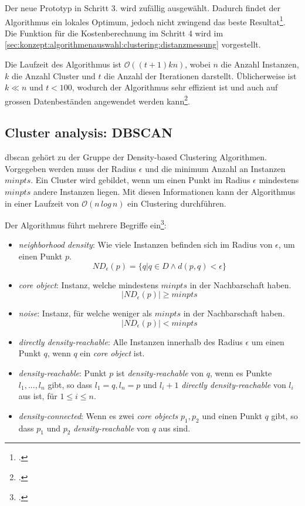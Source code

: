 Der neue Prototyp in Schritt 3. wird zufällig ausgewählt. Dadurch findet der Algorithmus ein lokales Optimum, jedoch nicht zwingend das beste Resultat\footcite{data_mining_concepts_and_techniques}.
Die Funktion für die Kostenberechnung im Schritt 4 wird im \cref{sec:konzept:algorithmenauswahl:clustering:distanzmessung} vorgestellt.

Die Laufzeit des Algorithmus ist $\mathcal{O}((t+1)kn)$, wobei $n$ die Anzahl Instanzen, $k$ die Anzahl Cluster und $t$ die Anzahl der Iterationen darstellt. Üblicherweise ist $k \ll n$ und $t < 100$, wodurch der Algorithmus sehr effizient ist und auch auf grossen Datenbeständen angewendet werden kann\footcite{clustering_numeric_and_categorical_values}.

\subsection{Cluster analysis: DBSCAN}
\label{sec:recherche:algorithmen:dbscan}
\gls{dbscan} gehört zu der Gruppe der Density-based Clustering Algorithmen. 
Vorgegeben werden muss der Radius $\epsilon$ und die minimum Anzahl an Instanzen $minpts$. Ein Cluster wird gebildet, wenn um einen Punkt im Radius $\epsilon$ mindestens $minpts$ andere Instanzen liegen. Mit diesen Informationen kann der Algorithmus in einer Laufzeit von $\mathcal{O}(n\,log\,n)$ ein Clustering durchführen.

Der Algorithmus führt mehrere Begriffe ein\footcite{data_mining_concepts_and_techniques}:
\begin{itemize}
	\item \textit{neighborhood density}: Wie viele Instanzen befinden sich im Radius von $\epsilon$, um einen Punkt $p$. 
	\begin{equation}
	\mathit{ND}_{\epsilon}(p) = \{q | q \in D \wedge d(p,q) < \epsilon\}
	\end{equation}
	\item \textit{core object}: Instanz, welche mindestens $minpts$ in der Nachbarschaft haben.
	\begin{equation}
	|\mathit{ND}_{\epsilon}(p)| \geq minpts
	\end{equation}
	\item \textit{noise}: Instanz, für welche weniger als $minpts$ in der Nachbarschaft haben.
	\begin{equation}
	|\mathit{ND}_{\epsilon}(p)| < minpts
	\end{equation}
	\item \textit{directly density-reachable}: Alle Instanzen innerhalb des Radius $\epsilon$ um einen Punkt $q$, wenn $q$ ein \textit{core object} ist.
	\item \textit{density-reachable}: Punkt $p$ ist \textit{density-reachable} von $q$, wenn es Punkte $l_1,...,l_n$ gibt, so dass $l_1=q, l_n=p$ und $l_i+1$ \textit{directly density-reachable} von $l_i$ aus ist, für $1 \leq i \leq n$.
	\item \textit{density-connected}: Wenn es zwei \textit{core objects} $p_1,p_2$ und einen Punkt $q$ gibt, so dass $p_1$ und $p_2$ \textit{density-reachable} von $q$ aus sind.
\end{itemize}

